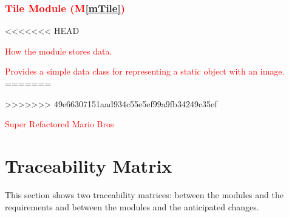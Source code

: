 \documentclass[12pt, titlepage]{article}
\newcommand{\mref}[1]{M\ref{#1}}
\begin{document}
\subsubsection{\textcolor{red}{Tile Module (\mref{mTile})}}

\begin{description}
<<<<<<< HEAD
\item[\textcolor{red}{Secrets:}] \textcolor{red}{How the module stores data.}
\item[\textcolor{red}{Services:}] \textcolor{red}{Provides a simple data class for representing a static object with an image.}
=======
\item[\textcolor{red}{Secrets:}] \textcolor{red}{}
\item[\textcolor{red}{Services:}] \textcolor{red}{}
>>>>>>> 49e66307151aad934c55e5ef99a9fb34249c35ef
\item[\textcolor{red}{Implemented By:}] \textcolor{red}{Super Refactored Mario Bros}
\end{description}

\section{Traceability Matrix} \label{SecTM}

This section shows two traceability matrices: between the modules and the
requirements and between the modules and the anticipated changes.
\end{document}
